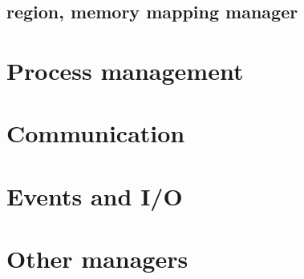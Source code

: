 \subsection*{region, memory mapping manager}

\section{Process management}

\section{Communication}

\section{Events and I/O}

\section{Other managers}

